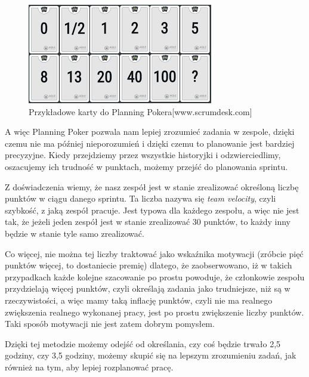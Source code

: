 \begin{figure}[H]
	\centering\includegraphics[width=\textwidth]{img/planningPokerCards.png}
	\caption{Przykładowe karty do Planning Pokera[www.scrumdesk.com]}\label{rysunek:poker}
\end{figure}

A więc Planning Poker pozwala nam lepiej zrozumieć zadania w zespole,
dzięki czemu nie ma później nieporozumień i dzięki czemu to planowanie jest bardziej precyzyjne.
Kiedy przejdziemy przez wszystkie historyjki i odzwierciedlimy, oszacujemy ich trudność w punktach,
możemy przejść do planowania sprintu.

Z doświadczenia wiemy, że nasz zespół jest w stanie zrealizować określoną liczbę punktów w ciągu danego sprintu.
Ta liczba nazywa się \textit{team velocity}, czyli szybkość, z jaką zespół pracuje.
Jest typowa dla każdego zespołu, a więc nie jest tak, że jeżeli jeden zespół
jest w stanie zrealizować 30 punktów, to każdy inny będzie w stanie tyle samo zrealizować.

Co więcej, nie można tej liczby traktować jako wskaźnika motywacji
(zróbcie pięć punktów więcej, to dostaniecie premię) dlatego,
że zaobserwowano, iż w takich przypadkach każde kolejne szacowanie po prostu powoduje,
że członkowie zespołu przydzielają więcej punktów, czyli określają zadania jako trudniejsze,
niż są w rzeczywistości, a więc mamy taką inflację punktów, czyli nie ma realnego
zwiększenia realnego wykonanej pracy, jest po prostu zwiększenie liczby punktów.
Taki sposób motywacji nie jest zatem dobrym pomysłem.

Dzięki tej metodzie możemy odejść od określania, czy coś będzie trwało 2,5 godziny,
czy 3,5 godziny, możemy skupić się na lepszym zrozumieniu zadań,
jak również na tym, aby lepiej rozplanować pracę.\cite{Cohen_2006}

